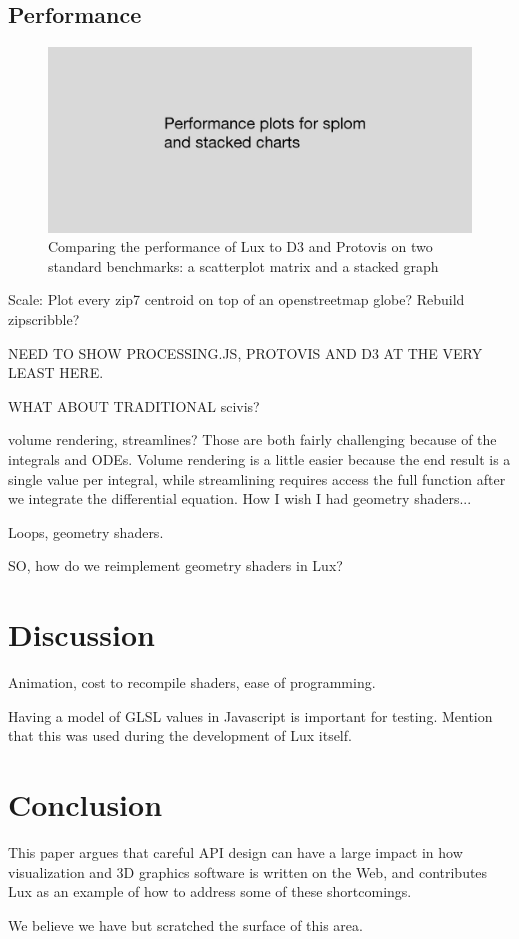 \subsection{Performance}

\begin{figure}
\includegraphics[width=\linewidth]{fig/performance/performance.jpg}
\caption{Comparing the performance of Lux to D3 and Protovis on two
standard benchmarks: a scatterplot matrix and a stacked graph}
\end{figure}

Scale: Plot every zip7 centroid on top of an openstreetmap globe?
Rebuild zipscribble?

NEED TO SHOW PROCESSING.JS, PROTOVIS AND D3 AT THE VERY LEAST HERE.

WHAT ABOUT TRADITIONAL scivis?

volume rendering, streamlines? Those are both fairly challenging
because of the integrals and ODEs. Volume rendering is a little easier
because the end result is a single value per integral, while
streamlining requires access the full function after we integrate the
differential equation. How I wish I had geometry shaders...

Loops, geometry shaders.

SO, how do we reimplement geometry shaders in Lux?

\section{Discussion\label{sec:discussion}}

Animation, cost to recompile shaders, ease of programming.

Having a model of GLSL values in Javascript is important for
testing. Mention that this was used during the development of Lux
itself.


\section{Conclusion}

This paper argues that careful API design can have a large impact in
how visualization and 3D graphics software is written on the Web, and
contributes Lux as an example of how to address some of these
shortcomings.

We believe we have but scratched the surface of this area.





